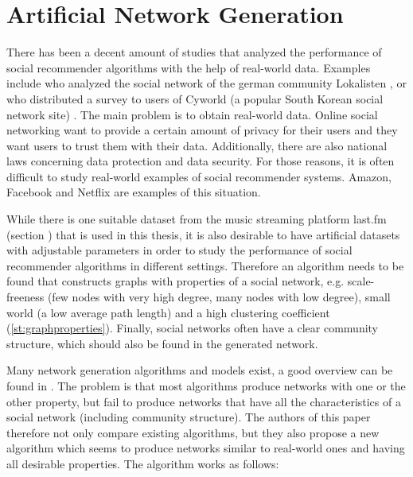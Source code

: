 \section{Artificial Network Generation}
\label{st:artificialnetworkgeneration} There has been a decent amount of studies that analyzed the performance of social recommender algorithms with the help of real-world data. Examples include \cite{Groh_2007} who analyzed the social network of the german community Lokalisten \cite{Lokalisten}, or \cite{Liu_2010} who distributed a survey to users of Cyworld (a popular South Korean social network site) \cite{Cyworld}. The main problem is to obtain real-world data. Online social networking want to provide a certain amount of privacy for their users and they want users to trust them with their data. Additionally, there are also national laws concerning data protection and data security. For those reasons, it is often difficult to study real-world examples of social recommender systems. Amazon, Facebook and Netflix are examples of this situation.

While there is one suitable dataset from the music streaming platform last.fm (section %
) that is used in this thesis, it is also desirable to have artificial datasets with adjustable parameters in order to study the performance of social recommender algorithms in different settings. Therefore an algorithm needs to be found that constructs graphs with properties of a social network, e.g. scale-freeness (few nodes with very high degree, many nodes with low degree), small world (a low average path length) and a high clustering coefficient (\ref{st:graphproperties}). Finally, social networks often have a clear community structure, which should also be found in the generated network.

Many network generation algorithms and models exist, a good overview can be found in \cite{Zaidi_2012}. The problem is that most algorithms produce networks with one or the other property, but fail to produce networks that have all the characteristics of a social network (including community structure). The authors of this paper therefore not only compare existing algorithms, but they also propose a new algorithm which seems to produce networks similar to real-world ones and having all desirable properties. The algorithm works as follows:

